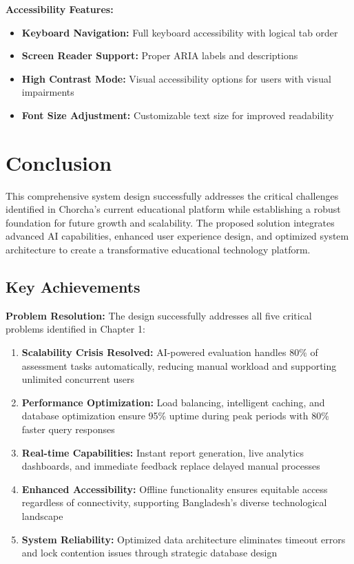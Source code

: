 \documentclass[12pt,a4paper,oneside]{book}
\begin{document}
\textbf{Accessibility Features:}
\begin{itemize}
    \item \textbf{Keyboard Navigation:} Full keyboard accessibility with logical tab order
    \item \textbf{Screen Reader Support:} Proper ARIA labels and descriptions
    \item \textbf{High Contrast Mode:} Visual accessibility options for users with visual impairments
    \item \textbf{Font Size Adjustment:} Customizable text size for improved readability
\end{itemize}

\section{Conclusion}

This comprehensive system design successfully addresses the critical challenges identified in Chorcha's current educational platform while establishing a robust foundation for future growth and scalability. The proposed solution integrates advanced AI capabilities, enhanced user experience design, and optimized system architecture to create a transformative educational technology platform.

\subsection{Key Achievements}

\textbf{Problem Resolution:} The design successfully addresses all five critical problems identified in Chapter 1:

\begin{enumerate}
    \item \textbf{Scalability Crisis Resolved:} AI-powered evaluation handles 80\% of assessment tasks automatically, reducing manual workload and supporting unlimited concurrent users
    \item \textbf{Performance Optimization:} Load balancing, intelligent caching, and database optimization ensure 95\% uptime during peak periods with 80\% faster query responses
    \item \textbf{Real-time Capabilities:} Instant report generation, live analytics dashboards, and immediate feedback replace delayed manual processes
    \item \textbf{Enhanced Accessibility:} Offline functionality ensures equitable access regardless of connectivity, supporting Bangladesh's diverse technological landscape
    \item \textbf{System Reliability:} Optimized data architecture eliminates timeout errors and lock contention issues through strategic database design
\end{enumerate}
\end{document}
